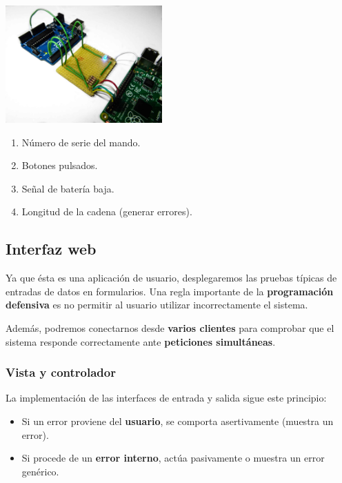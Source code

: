 \documentclass[10pt,a4paper]{article}
\begin{document}
	\begin{multicols}{2}
		\noindent
		\begin{center}
			\includegraphics[width=0.45\textwidth]{images/proto_uart} 
		\end{center}
		\columnbreak
		\begin{enumerate}
			\item Número de serie del mando.
			\item Botones pulsados.
			\item Señal de batería baja.
			\item Longitud de la cadena (generar errores).
		\end{enumerate}
	\end{multicols}

	\subsection{Interfaz web}
	
	Ya que ésta es una aplicación de usuario, desplegaremos las pruebas típicas de entradas de datos en formularios. Una regla importante de la \textbf{programación defensiva} es no permitir al usuario utilizar incorrectamente el sistema.
	
	Además, podremos conectarnos desde \textbf{varios clientes} para comprobar que el sistema responde correctamente ante \textbf{peticiones simultáneas}.
	
	\subsubsection*{Vista y controlador}
	
	La implementación de las interfaces de entrada y salida sigue este principio:
	
	\begin{itemize}
		\item Si un error proviene del \textbf{usuario}, se comporta asertivamente (muestra un error).
		\item Si procede de un \textbf{error interno}, actúa pasivamente o muestra un error genérico.
	\end{itemize}
	
\end{document}
